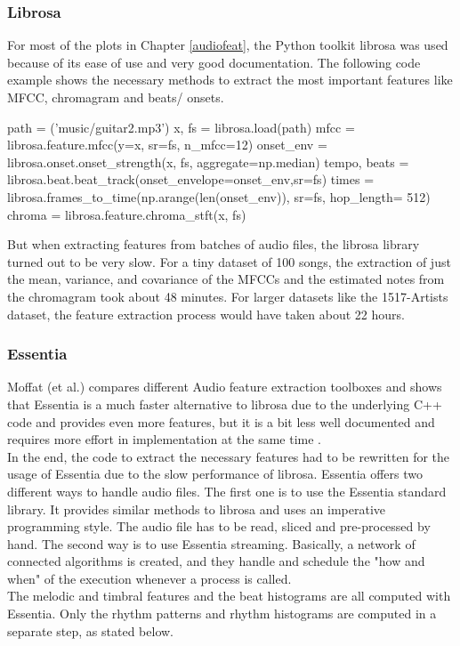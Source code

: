 \subsubsection{Librosa}

For most of the plots in Chapter \ref{audiofeat}, the Python toolkit librosa was used because of its ease of use and very good documentation. The following code example shows the necessary methods to extract the most important features like MFCC, chromagram and beats/ onsets.
\lstset{language=Python} 
\begin{pythonCode}[frame=single,label={lst:Librosa},caption={Librosa},captionpos=b]
path = ('music/guitar2.mp3')
x, fs = librosa.load(path)
mfcc = librosa.feature.mfcc(y=x, sr=fs, n_mfcc=12)
onset_env = librosa.onset.onset_strength(x, fs, aggregate=np.median)
tempo, beats = librosa.beat.beat_track(onset_envelope=onset_env,sr=fs)
times = librosa.frames_to_time(np.arange(len(onset_env)), sr=fs, hop_length= 512)
chroma = librosa.feature.chroma_stft(x, fs)
\end{pythonCode}	
But when extracting features from batches of audio files, the librosa library turned out to be very slow. For a tiny dataset of 100 songs, the extraction of just the mean, variance, and covariance of the MFCCs and the estimated notes from the chromagram took about 48 minutes. 
For larger datasets like the 1517-Artists dataset, the feature extraction process would have taken about 22 hours. 

\subsubsection{Essentia}

Moffat (et al.) compares different Audio feature extraction toolboxes and shows that Essentia is a much faster alternative to librosa due to the underlying C++ code and provides even more features, but it is a bit less well documented and requires more effort in implementation at the same time \cite{audiofeattoolb}.\\ 
In the end, the code to extract the necessary features had to be rewritten for the usage of Essentia due to the slow performance of librosa. Essentia offers two different ways to handle audio files. The first one is to use the Essentia standard library. It provides similar methods to librosa and uses an imperative programming style. The audio file has to be read, sliced and pre-processed by hand. The second way is to use Essentia streaming. Basically, a network of connected algorithms is created, and they handle and schedule the "how and when" of the execution whenever a process is called. \\
The melodic and timbral features and the beat histograms are all computed with Essentia. Only the rhythm patterns and rhythm histograms are computed in a separate step, as stated below. 

